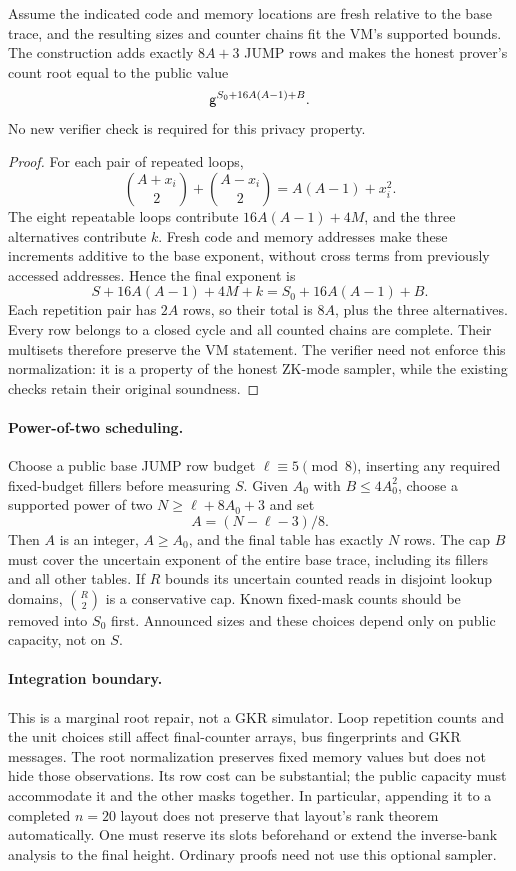 \begin{theorem}
Assume the indicated code and memory locations are fresh relative to the base trace, and the resulting sizes and counter chains fit the VM's supported bounds. The construction adds exactly $8A+3$ JUMP rows and makes the honest prover's count root equal to the public value
\[
 \mathsf{g}^{S_0+16A(A-1)+B}.
\]
No new verifier check is required for this privacy property.
\end{theorem}
\begin{proof}
For each pair of repeated loops,
\[
 \binom{A+x_i}{2}+\binom{A-x_i}{2}=A(A-1)+x_i^2.
\]
The eight repeatable loops contribute $16A(A-1)+4M$, and the three alternatives contribute $k$. Fresh code and memory addresses make these increments additive to the base exponent, without cross terms from previously accessed addresses. Hence the final exponent is
\[
 S+16A(A-1)+4M+k=S_0+16A(A-1)+B.
\]
Each repetition pair has $2A$ rows, so their total is $8A$, plus the three alternatives. Every row belongs to a closed cycle and all counted chains are complete. Their multisets therefore preserve the VM statement. The verifier need not enforce this normalization: it is a property of the honest ZK-mode sampler, while the existing checks retain their original soundness.
\end{proof}

\paragraph{Power-of-two scheduling.} Choose a public base JUMP row budget $\ell\equiv5\pmod8$, inserting any required fixed-budget fillers before measuring $S$. Given $A_0$ with $B\le4A_0^2$, choose a supported power of two $N\ge\ell+8A_0+3$ and set
\[
 A=(N-\ell-3)/8.
\]
Then $A$ is an integer, $A\ge A_0$, and the final table has exactly $N$ rows. The cap $B$ must cover the uncertain exponent of the entire base trace, including its fillers and all other tables. If $R$ bounds its uncertain counted reads in disjoint lookup domains, $\binom R2$ is a conservative cap. Known fixed-mask counts should be removed into $S_0$ first. Announced sizes and these choices depend only on public capacity, not on $S$.

\paragraph{Integration boundary.} This is a marginal root repair, not a GKR simulator. Loop repetition counts and the unit choices still affect final-counter arrays, bus fingerprints and GKR messages. The root normalization preserves fixed memory values but does not hide those observations. Its row cost can be substantial; the public capacity must accommodate it and the other masks together. In particular, appending it to a completed $n=20$ layout does not preserve that layout's rank theorem automatically. One must reserve its slots beforehand or extend the inverse-bank analysis to the final height. Ordinary proofs need not use this optional sampler.

